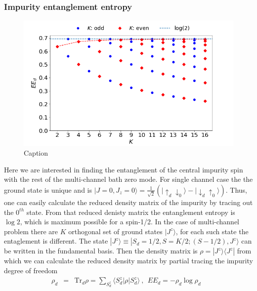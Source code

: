 \documentclass[reprint,prb,superscriptaddress]{revtex4-2}
\begin{document}
\subsubsection{Impurity entanglement entropy}
\begin{figure}[!htpb]
\centering
\includegraphics[scale=0.32]{plt/EE_multi_channel_ANN.png}
\caption{Caption }
\label{fig:EE_d}
\end{figure}
\noindent Here we are interested in finding the entanglement of the central impurity spin with the rest of the multi-channel bath zero mode. For single channel case the the ground state is unique and is $|J=0,J_z=0 \rangle = \frac{1}{\sqrt{2}} (|\uparrow_{d}\downarrow_0\rangle -|\downarrow_d \uparrow_0\rangle)$. Thus, one can easily calculate the reduced density matrix of the impurity by tracing out the $0^{th}$ state. From that reduced denisty matrix the entanglement entropy is $\log 2$, which is maximum possible for a spin-1/2. In the case of multi-channel problem there are $K$ orthogonal set of ground states $|J^z\rangle$, for each such state the entaglement is different. The state $|J^z\rangle \equiv |S_d=1/2,S=K/2;(S-1/2),J^z\rangle$ can be written in the fundamental basis. 
Then the density matrix is $\rho=|J^z\rangle\langle J^z|$ from which we can calculate the reduced density matrix by partial tracing the impurity degree of freedom 
\begin{eqnarray}
\rho_{d}&=& \textrm{Tr}_{d} \rho=\sum_{S_d^z} \langle S_d^z| \rho | S^z_d\rangle ~,~~EE_d = -\rho_{d} \log \rho_{d}~~~
\end{eqnarray}
\end{document}
